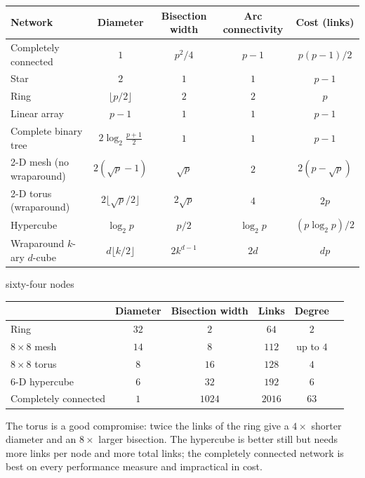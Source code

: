 \begin{center}
\small
\renewcommand{\arraystretch}{1.3}
\begin{tabular}{@{}lcccc@{}}
\toprule
\textbf{Network} & \textbf{Diameter} & \textbf{Bisection width} & \textbf{Arc connectivity} & \textbf{Cost (links)}\\
\midrule
Completely connected & $1$ & $p^{2}/4$ & $p-1$ & $p(p-1)/2$\\
Star & $2$ & $1$ & $1$ & $p-1$\\
Ring & $\lfloor p/2\rfloor$ & $2$ & $2$ & $p$\\
Linear array & $p-1$ & $1$ & $1$ & $p-1$\\
Complete binary tree & $2\log_2\frac{p+1}{2}$ & $1$ & $1$ & $p-1$\\
2-D mesh (no wraparound) & $2(\sqrt p-1)$ & $\sqrt p$ & $2$ & $2(p-\sqrt p)$\\
2-D torus (wraparound) & $2\lfloor\sqrt p/2\rfloor$ & $2\sqrt p$ & $4$ & $2p$\\
Hypercube & $\log_2 p$ & $p/2$ & $\log_2 p$ & $(p\log_2 p)/2$\\
Wraparound $k$-ary $d$-cube & $d\lfloor k/2\rfloor$ & $2k^{d-1}$ & $2d$ & $dp$\\
\bottomrule
\end{tabular}
\end{center}

\begin{workedex}{sixty-four nodes}
\begin{center}
\small
\begin{tabular}{@{}lccccc@{}}
\toprule
 & Diameter & Bisection width & Links & Degree\\
\midrule
Ring & $32$ & $2$ & $64$ & $2$\\
$8\times8$ mesh & $14$ & $8$ & $112$ & up to $4$\\
$8\times8$ torus & $8$ & $16$ & $128$ & $4$\\
6-D hypercube & $6$ & $32$ & $192$ & $6$\\
Completely connected & $1$ & $1024$ & $2016$ & $63$\\
\bottomrule
\end{tabular}
\end{center}
The torus is a good compromise: twice the links of the ring give a $4\times$ shorter diameter and an $8\times$ larger bisection. The hypercube is
better still but needs more links per node and more total links; the completely connected network is best on every performance measure and
impractical in cost.
\end{workedex}

